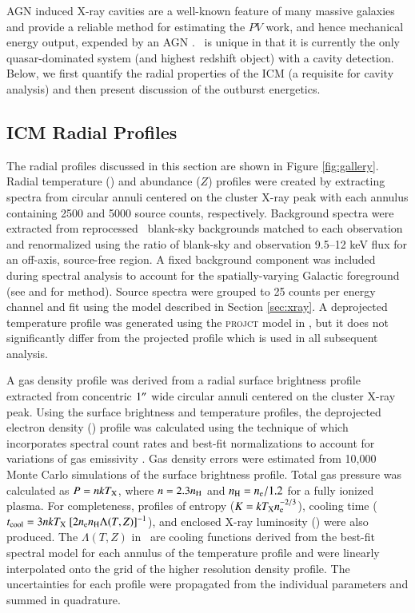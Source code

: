 \documentclass[referee,traditabstract]{aa}
\begin{document}
AGN induced X-ray cavities are a well-known feature of many massive
galaxies and provide a reliable method for estimating the $PV$ work,
and hence mechanical energy output, expended by an AGN \citep[see][for
  a review]{mcnamrev}. \irs\ is unique in that it is currently the
only quasar-dominated system (and highest redshift object) with a
cavity detection. Below, we first quantify the radial properties of
the ICM (a requisite for cavity analysis) and then present discussion
of the outburst energetics.

\subsection{ICM Radial Profiles}

The radial profiles discussed in this section are shown in Figure
\ref{fig:gallery}. Radial temperature (\tx) and abundance ($Z$)
profiles were created by extracting spectra from circular annuli
centered on the cluster X-ray peak with each annulus containing 2500
and 5000 source counts, respectively. Background spectra were
extracted from reprocessed \caldb\ blank-sky backgrounds matched to
each observation and renormalized using the ratio of blank-sky and
observation 9.5--12 keV flux for an off-axis, source-free region. A
fixed background component was included during spectral analysis to
account for the spatially-varying Galactic foreground (see
\citealt{2005ApJ...628..655V} and \citealt{xrayband} for
method). Source spectra were grouped to 25 counts per energy channel
and fit using the model described in Section \ref{sec:xray}. A
deprojected temperature profile was generated using the
\textsc{projct} model in \xspec, but it does not significantly differ
from the projected profile which is used in all subsequent analysis.

A gas density profile was derived from a radial surface brightness
profile extracted from concentric $1\rm{^\prime}\hskip -0.1em\rm{^\prime}$ wide circular annuli
centered on the cluster X-ray peak. Using the surface brightness and
temperature profiles, the deprojected electron density (\nelec)
profile was calculated using the technique of \citet{kriss83} which
incorporates spectral count rates and best-fit normalizations to
account for variations of gas emissivity \citep[see][for method
  details]{accept}. Gas density errors were estimated from 10,000
Monte Carlo simulations of the surface brightness profile. Total gas
pressure was calculated as $P = n kT_{\rm{X}}$, where $n = 2.3 n_{\rm{H}}$ and $n_{\rm{H}} =
n_{\rm{e}}/1.2$ for a fully ionized plasma. For completeness, profiles of
entropy ($K = kT_{\rm{X}}n_{\rm{e}}^{-2/3}$), cooling time ($t_{\rm{cool}} =
3nkT_{\rm{X}}~[2n_{\rm{e}} n_{\rm{H}} \Lambda(T,Z)]^{-1}$), and enclosed X-ray luminosity
(\lx) were also produced. The $\Lambda(T,Z)$ in \tcool\ are cooling
functions derived from the best-fit spectral model for each annulus of
the temperature profile and were linearly interpolated onto the grid
of the higher resolution density profile. The uncertainties for each
profile were propagated from the individual parameters and summed in
quadrature.
\end{document}
